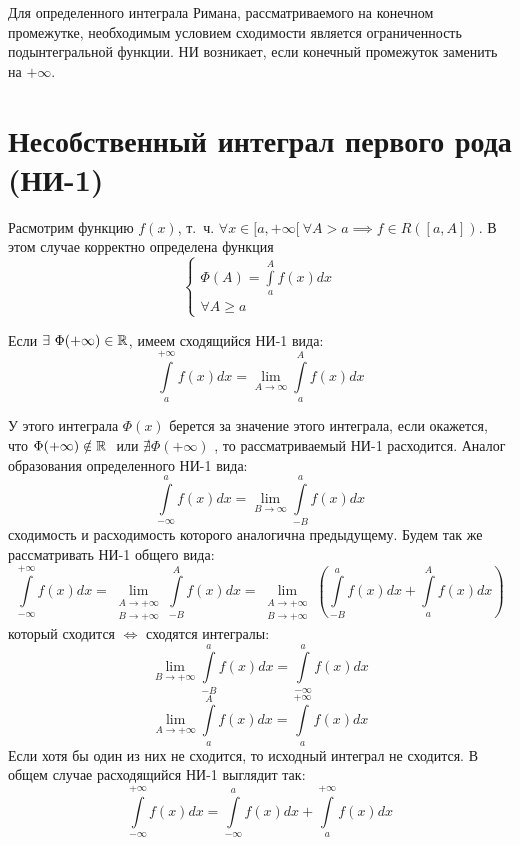 \documentclass[../../main.tex]{subfiles}
\begin{document}
Для определенного интеграла Римана, рассматриваемого на конечном промежутке,
необходимым условием сходимости является ограниченность подынтегральной функции.
НИ возникает, если конечный промежуток заменить на $+\infty$.

\section{Несобственный интеграл первого рода (НИ-1)}

Расмотрим функцию $f(x)$, т.~ч.
$\forall x \in [a, +\infty[ \ \forall A > a \implies f \in R([a, A])$.
В этом случае корректно определена функция
\begin{equation}
    \label{7:1}
    \begin{cases}
        \Phi(A) = \int\limits_a^A f(x)dx\\
        \forall A \geq a
    \end{cases}
\end{equation}

Если $\exists \ \Phi(+\infty) \in \mathbb{R}$, имеем сходящийся НИ-1 вида:
\begin{equation}
    \label{7:2}
    \int\limits_a^{+\infty} f(x)dx =
    \lim\limits_{A \to \infty} \int\limits_a^A f(x)dx
\end{equation}

У этого интеграла $\Phi(x)$ берется за значение этого интеграла, если окажется,
что $\Phi(+\infty) \\ \notin \mathbb{R} \ $ или $ \nexists \Phi(+\infty)$
, то рассматриваемый НИ-1 расходится.
Аналог образования определенного НИ-1 вида:
\[\int\limits_{-\infty}^a f(x)dx =
\lim\limits_{B \to \infty} \int\limits_{-B}^a f(x)dx \]
сходимость и расходимость которого аналогична предыдущему.
Будем так же рассматривать НИ-1 общего вида:
\[ \int\limits_{-\infty}^{+\infty} f(x)dx =
\lim\limits_{\substack{A \to +\infty \\ B \to +\infty}}
\int\limits_{-B}^A f(x)dx =
\lim\limits_{\substack{A \to +\infty \\ B \to +\infty}}
\left( \int\limits_{-B}^a f(x)dx + \int\limits_a^{A} f(x)dx \right) \]
который сходится $\iff$ сходятся интегралы:
\[ \lim\limits_{B \to +\infty} \int\limits_{-B}^a f(x)dx
= \int\limits_{-\infty}^a f(x)dx \]
\[\lim\limits_{A \to +\infty} \int\limits_a^{A} f(x)dx
= \int\limits_a^{+\infty} f(x)dx \]
Если хотя бы один из них не сходится, то исходный интеграл не сходится.
В общем случае расходящийся НИ-1 выглядит так:
\[ \int\limits_{-\infty}^{+\infty} f(x)dx  = \int\limits_{-\infty}^a f(x)dx
+ \int\limits_a^{+\infty} f(x)dx\]
\end{document}
